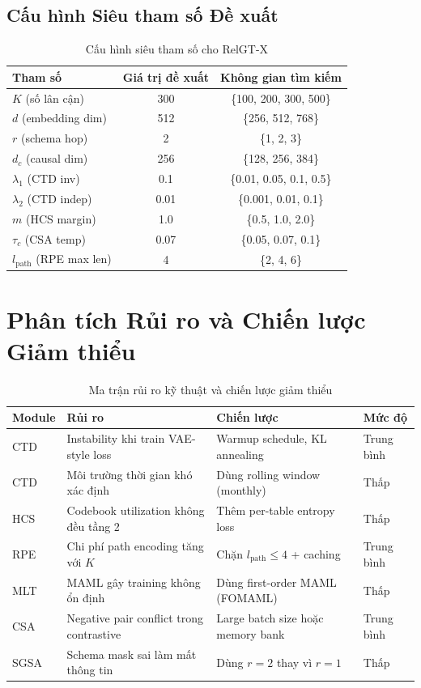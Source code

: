 \documentclass[12pt,a4paper]{article}
\begin{document}
\subsection{Cấu hình Siêu tham số Đề xuất}

\begin{table}[H]
\centering
\caption{Cấu hình siêu tham số cho RelGT-X}
\begin{tabular}{lcc}
\toprule
\textbf{Tham số} & \textbf{Giá trị đề xuất} & \textbf{Không gian tìm kiếm} \\
\midrule
$K$ (số lân cận) & 300 & \{100, 200, 300, 500\} \\
$d$ (embedding dim) & 512 & \{256, 512, 768\} \\
$r$ (schema hop) & 2 & \{1, 2, 3\} \\
$d_c$ (causal dim) & 256 & \{128, 256, 384\} \\
$\lambda_1$ (CTD inv) & 0.1 & \{0.01, 0.05, 0.1, 0.5\} \\
$\lambda_2$ (CTD indep) & 0.01 & \{0.001, 0.01, 0.1\} \\
$m$ (HCS margin) & 1.0 & \{0.5, 1.0, 2.0\} \\
$\tau_c$ (CSA temp) & 0.07 & \{0.05, 0.07, 0.1\} \\
$l_\text{path}$ (RPE max len) & 4 & \{2, 4, 6\} \\
\bottomrule
\end{tabular}
\end{table}

\section{Phân tích Rủi ro và Chiến lược Giảm thiểu}

\begin{table}[H]
\centering
\caption{Ma trận rủi ro kỹ thuật và chiến lược giảm thiểu}
\renewcommand{\arraystretch}{1.4}
\begin{tabularx}{\textwidth}{lXXl}
\toprule
\textbf{Module} & \textbf{Rủi ro} & \textbf{Chiến lược} & \textbf{Mức độ} \\
\midrule
CTD & Instability khi train VAE-style loss & Warmup schedule, KL annealing & Trung bình \\
CTD & Môi trường thời gian khó xác định & Dùng rolling window (monthly) & Thấp \\
HCS & Codebook utilization không đều tầng 2 & Thêm per-table entropy loss & Thấp \\
RPE & Chi phí path encoding tăng với $K$ & Chặn $l_\text{path} \le 4$ + caching & Trung bình \\
MLT & MAML gây training không ổn định & Dùng first-order MAML (FOMAML) & Thấp \\
CSA & Negative pair conflict trong contrastive & Large batch size hoặc memory bank & Trung bình \\
SGSA & Schema mask sai làm mất thông tin & Dùng $r=2$ thay vì $r=1$ & Thấp \\
\bottomrule
\end{tabularx}
\end{table}
\end{document}
